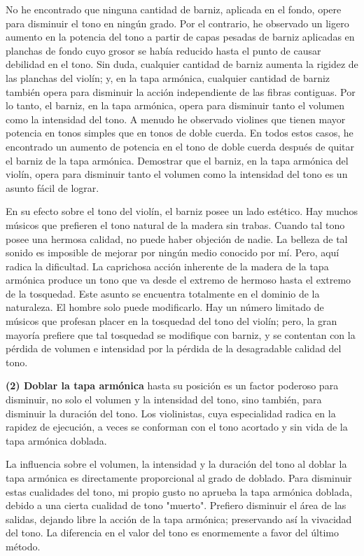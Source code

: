 \documentclass[12pt]{book}
\begin{document}
No he encontrado que ninguna cantidad de barniz, aplicada en el fondo, opere para disminuir el tono en ningún grado. Por el contrario, he observado un ligero aumento en la potencia del tono a partir de capas pesadas de barniz aplicadas en planchas de fondo cuyo grosor se había reducido hasta el punto de causar debilidad en el tono. Sin duda, cualquier cantidad de barniz aumenta la rigidez de las planchas del violín; y, en la tapa armónica, cualquier cantidad de barniz también opera para disminuir la acción independiente de las fibras contiguas. Por lo tanto, el barniz, en la tapa armónica, opera para disminuir tanto el volumen como la intensidad del tono. A menudo he observado violines que tienen mayor potencia en tonos simples que en tonos de doble cuerda. En todos estos casos, he encontrado un aumento de potencia en el tono de doble cuerda después de quitar el barniz de la tapa armónica. Demostrar que el barniz, en la tapa armónica del violín, opera para disminuir tanto el volumen como la intensidad del tono es un asunto fácil de lograr.

En su efecto sobre el tono del violín, el barniz posee un lado estético. Hay muchos músicos que prefieren el tono natural de la madera sin trabas. Cuando tal tono posee una hermosa calidad, no puede haber objeción de nadie. La belleza de tal sonido es imposible de mejorar por ningún medio conocido por mí. Pero, aquí radica la dificultad. La caprichosa acción inherente de la madera de la tapa armónica produce un tono que va desde el extremo de hermoso hasta el extremo de la tosquedad. Este asunto se encuentra totalmente en el dominio de la naturaleza. El hombre solo puede modificarlo. Hay un número limitado de músicos que profesan placer en la tosquedad del tono del violín; pero, la gran mayoría prefiere que tal tosquedad se modifique con barniz, y se contentan con la pérdida de volumen e intensidad por la pérdida de la desagradable calidad del tono.

\textbf{(2) Doblar la tapa armónica} hasta su posición es un factor poderoso para disminuir, no solo el volumen y la intensidad del tono, sino también, para disminuir la duración del tono. Los violinistas, cuya especialidad radica en la rapidez de ejecución, a veces se conforman con el tono acortado y sin vida de la tapa armónica doblada.

La influencia sobre el volumen, la intensidad y la duración del tono al doblar la tapa armónica es directamente proporcional al grado de doblado. Para disminuir estas cualidades del tono, mi propio gusto no aprueba la tapa armónica doblada, debido a una cierta cualidad de tono "muerto". Prefiero disminuir el área de las salidas, dejando libre la acción de la tapa armónica; preservando así la vivacidad del tono. La diferencia en el valor del tono es enormemente a favor del último método.
\end{document}
